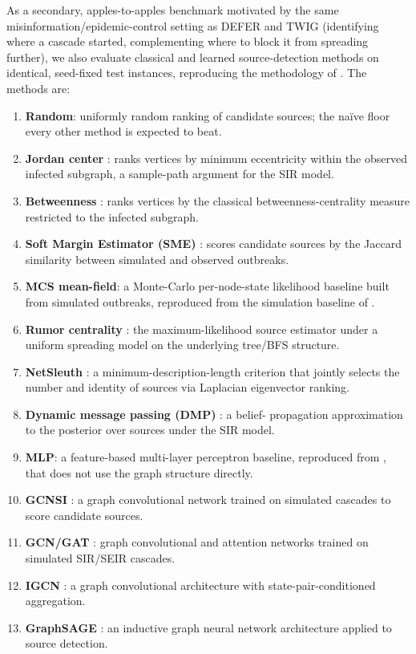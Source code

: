 \documentclass[ijoc,sglanonrev]{informs4}
\begin{document}
As a secondary, apples-to-apples benchmark motivated by the same
misinformation/epidemic-control setting as DEFER and TWIG (identifying
where a cascade started, complementing where to block it from spreading
further), we also evaluate classical and learned source-detection methods
on identical, seed-fixed test instances, reproducing the methodology of
\citet{sterchi2026}. The methods are:

\begin{enumerate}
\item \textbf{Random}: uniformly random ranking of candidate sources; the
  na\"ive floor every other method is expected to beat.
\item \textbf{Jordan center} \citep{zhu2016}: ranks vertices by minimum
  eccentricity within the observed infected subgraph, a sample-path
  argument for the SIR model.
\item \textbf{Betweenness} \citep{freeman1977}: ranks vertices by the
  classical betweenness-centrality measure restricted to the infected
  subgraph.
\item \textbf{Soft Margin Estimator (SME)} \citep{antulov2015}: scores
  candidate sources by the Jaccard similarity between simulated and
  observed outbreaks.
\item \textbf{MCS mean-field}: a Monte-Carlo per-node-state likelihood
  baseline built from simulated outbreaks, reproduced from the simulation
  baseline of \citet{sterchi2026}.
\item \textbf{Rumor centrality} \citep{shah2011}: the maximum-likelihood
  source estimator under a uniform spreading model on the underlying
  tree/BFS structure.
\item \textbf{NetSleuth} \citep{prakash2012}: a minimum-description-length
  criterion that jointly selects the number and identity of sources via
  Laplacian eigenvector ranking.
\item \textbf{Dynamic message passing (DMP)} \citep{lokhov2014}: a belief-
  propagation approximation to the posterior over sources under the SIR
  model.
\item \textbf{MLP}: a feature-based multi-layer perceptron baseline,
  reproduced from \citet{sterchi2026}, that does not use the graph
  structure directly.
\item \textbf{GCNSI} \citep{dong2019}: a graph convolutional network
  trained on simulated cascades to score candidate sources.
\item \textbf{GCN/GAT} \citep{shah2020}: graph convolutional and
  attention networks trained on simulated SIR/SEIR cascades.
\item \textbf{IGCN} \citep{guo2021}: a graph convolutional architecture
  with state-pair-conditioned aggregation.
\item \textbf{GraphSAGE} \citep{haddad2023}: an inductive graph neural
  network architecture applied to source detection.
\end{enumerate}
\end{document}
